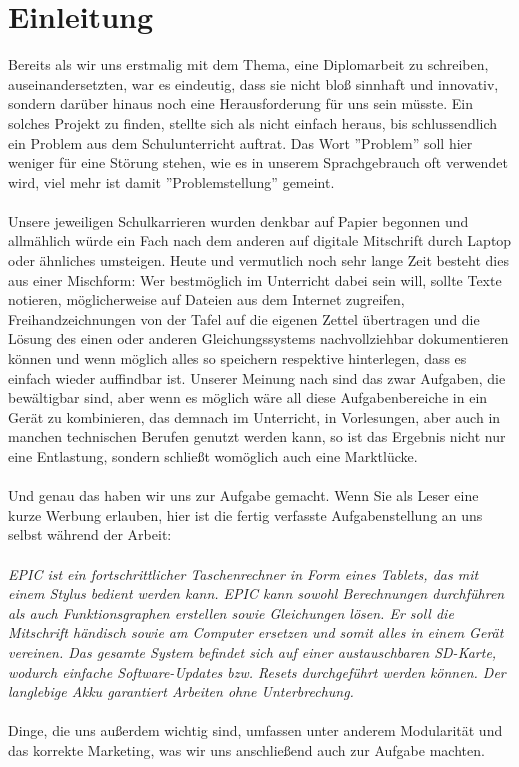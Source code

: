 \section{Einleitung}
Bereits als wir uns erstmalig mit dem Thema, eine Diplomarbeit zu schreiben, auseinandersetzten, war es eindeutig, dass sie nicht bloß sinnhaft und innovativ, sondern darüber hinaus noch eine Herausforderung für uns sein müsste. Ein solches Projekt zu finden, stellte sich als nicht einfach heraus, bis schlussendlich ein Problem aus dem Schulunterricht auftrat. Das Wort ''Problem'' soll hier weniger für eine Störung stehen, wie es in unserem Sprachgebrauch oft verwendet wird, viel mehr ist damit ''Problemstellung'' gemeint.\\\\
Unsere jeweiligen Schulkarrieren wurden denkbar auf Papier begonnen und allmählich würde ein Fach nach dem anderen auf digitale Mitschrift durch Laptop oder ähnliches umsteigen. Heute und vermutlich noch sehr lange Zeit besteht dies aus einer Mischform: Wer bestmöglich im Unterricht dabei sein will, sollte Texte notieren, möglicherweise auf Dateien aus dem Internet zugreifen, Freihandzeichnungen von der Tafel auf die eigenen Zettel übertragen und die Lösung des einen oder anderen Gleichungssystems nachvollziehbar dokumentieren können und wenn möglich alles so speichern respektive hinterlegen, dass es einfach wieder auffindbar ist. Unserer Meinung nach sind das zwar Aufgaben, die bewältigbar sind, aber wenn es möglich wäre all diese Aufgabenbereiche in ein Gerät zu kombinieren, das demnach im Unterricht, in Vorlesungen, aber auch in manchen technischen Berufen genutzt werden kann, so ist das Ergebnis nicht nur eine Entlastung, sondern schließt womöglich auch eine Marktlücke.\\\\
Und genau das haben wir uns zur Aufgabe gemacht. Wenn Sie als Leser eine kurze Werbung erlauben, hier ist die fertig verfasste Aufgabenstellung an uns selbst während der Arbeit:\\\\
\textit{EPIC ist ein fortschrittlicher Taschenrechner in Form eines Tablets, das mit einem Stylus bedient werden kann. EPIC kann sowohl Berechnungen durchführen als auch Funktionsgraphen erstellen sowie Gleichungen lösen. Er soll die Mitschrift händisch sowie am Computer ersetzen und somit alles in einem Gerät vereinen. Das gesamte System befindet sich auf einer austauschbaren SD-Karte, wodurch einfache Software-Updates bzw. Resets durchgeführt werden können. Der langlebige Akku garantiert Arbeiten ohne Unterbrechung.}\\\\
Dinge, die uns außerdem wichtig sind, umfassen unter anderem Modularität und das korrekte Marketing, was wir uns anschließend auch zur Aufgabe machten.

